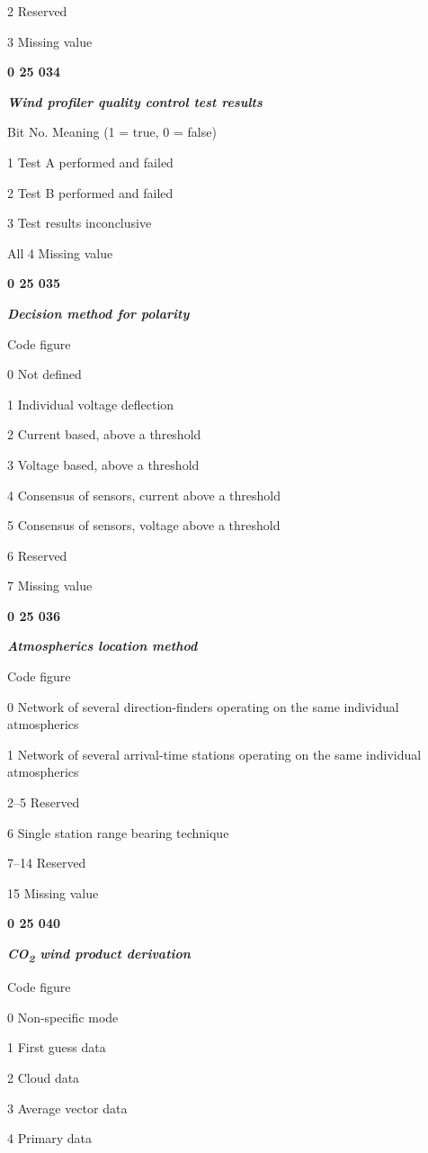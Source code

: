 2 Reserved

3 Missing value

\textbf{0 25 034}

\emph{\textbf{Wind profiler quality control test results}}

Bit No. Meaning (1 = true, 0 = false)

1 Test A performed and failed

2 Test B performed and failed

3 Test results inconclusive

All 4 Missing value

\textbf{0 25 035}

\emph{\textbf{Decision method for polarity}}

Code figure

0 Not defined

1 Individual voltage deflection

2 Current based, above a threshold

3 Voltage based, above a threshold

4 Consensus of sensors, current above a threshold

5 Consensus of sensors, voltage above a threshold

6 Reserved

7 Missing value

\textbf{0 25 036}

\emph{\textbf{Atmospherics location method}}

Code figure

0 Network of several direction-finders operating on the same individual atmospherics

1 Network of several arrival-time stations operating on the same individual atmospherics

2--5 Reserved

6 Single station range bearing technique

7--14 Reserved

15 Missing value

\textbf{0 25 040}

\emph{\textbf{CO\textsubscript{2} wind product derivation}}

Code figure

0 Non-specific mode

1 First guess data

2 Cloud data

3 Average vector data

4 Primary data

